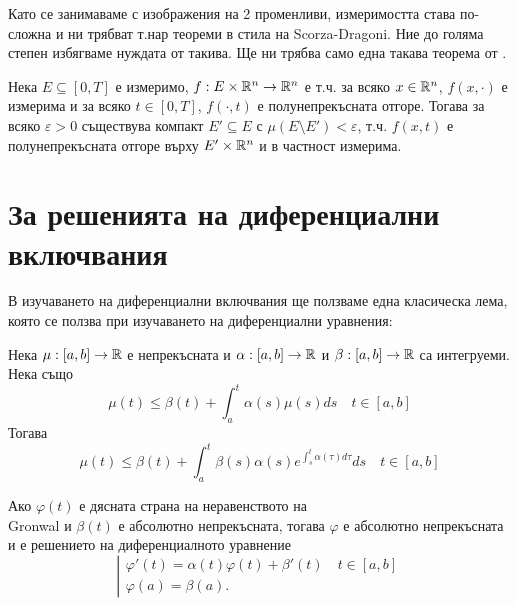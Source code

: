 Като се занимаваме с изображения на 2 променливи, измеримостта става по-сложна и ни трябват т.нар теореми в стила на Scorza-Dragoni. Ние до голяма степен избягваме нуждата от такива. Ще ни трябва само една такава теорема от \cite{Scorza-Dragoni}.

\begin{theorem} \label{Scorza}
    Нека $E\subseteq [0,T]$ е измеримо, $f:E\times\mathbb{R}^n\to\mathbb{R}^n$ е т.ч. за всяко $x\in\mathbb{R}^n$, $f(x, \cdot)$ е измерима и за всяко $t\in [0,T]$, $f(\cdot, t)$ е полунепрекъсната отгоре.
    Тогава за всяко $\varepsilon > 0$ съществува компакт $E'\subseteq E$ с $\mu(E\setminus E') < \varepsilon$, т.ч. $f(x,t)$ е полунепрекъсната отгоре върху $E' \times\mathbb{R}^n$ и в частност измерима.
\end{theorem}

\section{За решенията на диференциални включвания}
В изучаването на диференциални включвания ще ползваме една класическа лема, която се ползва при изучаването на диференциални уравнения:

\begin{lemma}[Gronwal]
    Нека $\mu:[a,b]\to\mathbb{R}$ е непрекъсната и $\alpha:[a,b]\to\mathbb{R}$ и $\beta:[a,b]\to\mathbb{R}$ са интегруеми. Нека също
    \[
        \mu(t) \leq \beta(t) + \int_a^t \alpha(s) \mu(s) ds  \quad t\in[a,b]
    \]
    Тогава
    \[
        \mu(t) \leq \beta(t) + \int_a^t \beta(s)\alpha(s)e^{\int_s^t \alpha(\tau)d\tau}ds \quad t\in [a,b]
    \]
\end{lemma}

\begin{note}
    Ако $\varphi(t)$ е дясната страна на неравенството на\\ Gronwal и $\beta(t)$ е абсолютно непрекъсната, тогава $\varphi$ е абсолютно непрекъсната и е решението на диференциалното уравнение
    \[
        \left|
        \begin{array}{ll}
            \varphi'(t) = \alpha(t)\varphi(t) + \beta'(t)\quad t\in[a,b]\\
            \varphi(a) = \beta(a).
        \end{array}
        \right.
    \]
\end{note}

